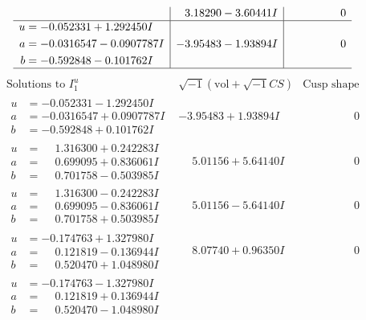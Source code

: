 \documentclass[1p]{elsarticle_modified}
\theoremstyle{definition}
\newcommand{\I}{\sqrt{-1}}
\begin{document}
$$\begin{array}{c|c|c}
 & \phantom{-}3.18290 - 3.60441 I & \phantom{-0.000000 } 0 \\ \hline\begin{aligned}
u &= -0.052331 + 1.292450 I \\
a &= -0.0316547 - 0.0907787 I \\
b &= -0.592848 - 0.101762 I\end{aligned}
 & -3.95483 - 1.93894 I & \phantom{-0.000000 } 0\\
 \hline 
 \end{array}$$\newpage$$\begin{array}{c|c|c}  
\text{Solutions to }I^u_{1}& \I (\text{vol} + \sqrt{-1}CS) & \text{Cusp shape}\\
 \hline 
\begin{aligned}
u &= -0.052331 - 1.292450 I \\
a &= -0.0316547 + 0.0907787 I \\
b &= -0.592848 + 0.101762 I\end{aligned}
 & -3.95483 + 1.93894 I & \phantom{-0.000000 } 0 \\ \hline\begin{aligned}
u &= \phantom{-}1.316300 + 0.242283 I \\
a &= \phantom{-}0.699095 + 0.836061 I \\
b &= \phantom{-}0.701758 - 0.503985 I\end{aligned}
 & \phantom{-}5.01156 + 5.64140 I & \phantom{-0.000000 } 0 \\ \hline\begin{aligned}
u &= \phantom{-}1.316300 - 0.242283 I \\
a &= \phantom{-}0.699095 - 0.836061 I \\
b &= \phantom{-}0.701758 + 0.503985 I\end{aligned}
 & \phantom{-}5.01156 - 5.64140 I & \phantom{-0.000000 } 0 \\ \hline\begin{aligned}
u &= -0.174763 + 1.327980 I \\
a &= \phantom{-}0.121819 - 0.136944 I \\
b &= \phantom{-}0.520470 + 1.048980 I\end{aligned}
 & \phantom{-}8.07740 + 0.96350 I & \phantom{-0.000000 } 0 \\ \hline\begin{aligned}
u &= -0.174763 - 1.327980 I \\
a &= \phantom{-}0.121819 + 0.136944 I \\
b &= \phantom{-}0.520470 - 1.048980 I\end{aligned}

\end{array}$$
\end{document}
